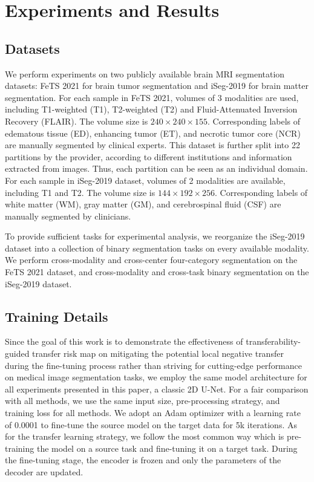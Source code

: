 \section{Experiments and Results}
\subsection{Datasets}
We perform experiments on two publicly available brain MRI segmentation datasets: FeTS 2021 \cite{FeTS1,FeTS2,FeTS3} for brain tumor segmentation and iSeg-2019\cite{iseg} for brain matter segmentation. 
For each sample in FeTS 2021, volumes of 3 modalities are used, including T1-weighted (T1), T2-weighted (T2) and Fluid-Attenuated Inversion Recovery (FLAIR). The volume size is $240 \times 240 \times 155$. Corresponding labels of edematous tissue (ED), enhancing tumor (ET), and necrotic tumor core (NCR) are manually segmented by clinical experts. This dataset is further split into 22 partitions by the provider, according to different institutions and information extracted from images. Thus, each partition can be seen as an individual domain. For each sample in iSeg-2019 dataset, volumes of 2 modalities are available, including T1 and T2. The volume size is $144 \times 192 \times 256$. Corresponding labels of white matter (WM), gray matter (GM), and cerebrospinal fluid (CSF) are manually segmented by clinicians. 

To provide sufficient tasks for experimental analysis, we reorganize the iSeg-2019 dataset into a collection of binary segmentation tasks on every available modality. We perform cross-modality and cross-center four-category segmentation on the FeTS 2021 dataset, and cross-modality and cross-task binary segmentation on the iSeg-2019 dataset.


\subsection{Training Details}
Since the goal of this work is to demonstrate the effectiveness of transferability-guided transfer risk map on mitigating the potential local negative transfer during the fine-tuning process rather than striving for cutting-edge performance on medical image segmentation tasks, we employ the same model architecture for all experiments presented in this paper, a classic 2D U-Net\cite{unet}.  
For a fair comparison with all methods, we use the same input size, pre-processing strategy, and training loss for all methods. We adopt an Adam optimizer with a learning rate of 0.0001 to fine-tune the source model on the target data for 5k iterations. As for the transfer learning strategy, we follow the most common way which is pre-training the model on a source task and fine-tuning it on a target task. During the fine-tuning stage, the encoder is frozen and only the parameters of the decoder are updated. 

